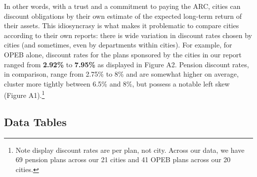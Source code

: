 \documentclass[12pt]{article}
\begin{document}
\begin{figure}[h]
  \label{fig:key}
\end{figure}

In other words, with a trust and a commitment to paying the ARC, cities
can discount obligations by their own estimate of the expected long-term
return of their assets. This idiosyncrasy is what makes it problematic
to compare cities according to their own reports: there is wide
variation in discount rates chosen by cities (and sometimes, even by
departments within cities). For example, for OPEB alone, discount rates
for the plans sponsored by the cities in our report ranged from
\textbf{2.92\%} to \textbf{7.95\%} as displayed in Figure A2.  Pension discount rates, in comparison, range from 2.75\% to 8\% and are somewhat higher on average, cluster more tightly between 6.5\% and 8\%,  but possess a notable left skew (Figure A1).\footnote{Note display discount rates are per plan, not city. Across our data, we have 69 pension plans across our 21 cities and 41 OPEB plans across our 20 cities.}



\subsection{Data Tables}
\end{document}
